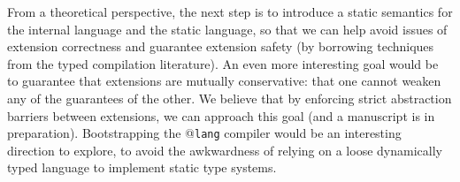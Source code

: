 \documentclass[9pt]{sigplanconf}
\begin{document}
From a theoretical perspective, the next step is to introduce a static semantics for the internal language and the static language, so that we can help avoid issues of extension correctness and guarantee extension safety (by borrowing techniques from the typed compilation literature). An even more interesting goal would be to guarantee that extensions are mutually conservative: that one cannot weaken any of the guarantees of the other. We believe that by enforcing strict abstraction barriers between extensions, we can approach this goal (and a manuscript is in preparation). Bootstrapping the @\texttt{lang} compiler would be an interesting direction to explore, to avoid the awkwardness of relying on a loose dynamically typed language to implement static type systems.
% 
\end{document}
